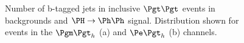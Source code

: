 \begin{figure}
\begin{center}

\end{center}
\caption[Number of b-tagged jets in inclusive $\Pgt\Pgt$ events in backgrounds and
$\PH\to\Ph\Ph$ signal.]{
Number of b-tagged jets in inclusive $\Pgt\Pgt$ events in backgrounds and
$\PH\to\Ph\Ph$ signal. Distribution shown for events in the $\mutau$ (a) and $\etau$
(b) channels. }
\label{fig:Hhhnbjets}
\end{figure} 


